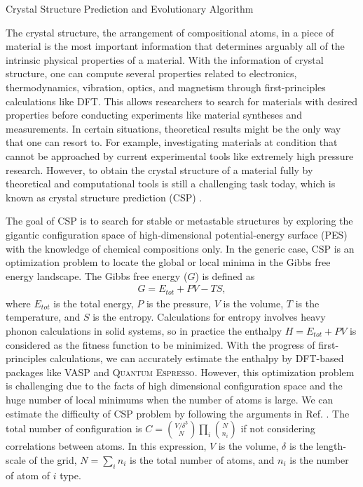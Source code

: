 	{\centering
		\vspace{12pt} Crystal Structure Prediction and Evolutionary Algorithm
	    \par
	}
The crystal structure, the arrangement of compositional atoms, in a piece of material is the most important information that determines arguably all of the intrinsic physical properties of a material. With the information of crystal structure, one can compute several properties related to electronics, thermodynamics, vibration, optics, and magnetism through first-principles calculations like DFT. This allows researchers to search for materials with desired properties before conducting experiments like material syntheses and measurements. In certain situations, theoretical results might be the only way that one can resort to. For example, investigating materials at condition that cannot be approached by current experimental tools like extremely high pressure research. However, to obtain the crystal structure of a material fully by theoretical and computational tools is still a challenging task today, which is known as crystal structure prediction (CSP) \cite{oganov2011modern}.

The goal of CSP is to search for stable or metastable structures by exploring the gigantic configuration space of high-dimensional potential-energy surface (PES) with the knowledge of chemical compositions only. In the generic case, CSP is an optimization problem to locate the global or local minima in the Gibbs free energy landscape. The Gibbs free energy ($G$) is defined as
	\begin{equation}
		\label{eq}
		\begin{aligned}
			G = E_{tot} + PV - TS,
		\end{aligned}
	\end{equation}
where $E_{tot}$ is the total energy, $P$ is the pressure, $V$ is the volume, $T$ is the temperature, and $S$ is the entropy. Calculations for entropy involves heavy phonon calculations in solid systems, so in practice the enthalpy $H = E_{tot} + PV$ is considered as the fitness function to be minimized. With the progress of first-principles calculations, we can accurately estimate the enthalpy by DFT-based packages like VASP and \textsc{Quantum Espresso}. However, this optimization problem is challenging due to the facts of high dimensional configuration space and the huge number of local minimums when the number of atoms is large. We can estimate the difficulty of CSP problem by following the arguments in Ref. \cite{oganov2011evolutionary}. The total number of configuration is $C =  {V/\delta^3 \choose N} \prod_{i} {N \choose n_i}$ if not considering correlations between atoms. In this expression, $V$ is the volume, $\delta$ is the length-scale of the grid, $N = \sum_i n_i$ is the total number of atoms, and $n_i$ is the number of atom of $i$ type.


